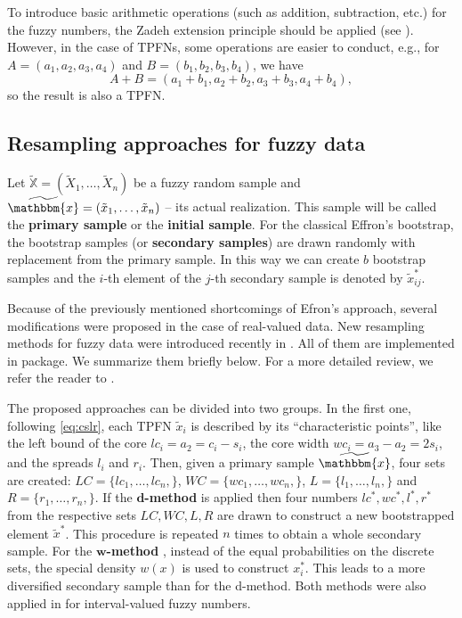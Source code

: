 To introduce basic arithmetic operations (such as addition, subtraction, etc.) for the fuzzy numbers, the Zadeh extension principle should be applied (see \cite{ban_coroianu_pg}).
However, in the case of TPFNs, some operations are easier to conduct, e.g., for $A = (a_1, a_2, a_3, a_4) $ and $B = (b_1, b_2, b_3, b_4)$, we have
\begin{equation}
	A + B = (a_1+b_1, a_2+b_2, a_3+b_3,a_4+b_4) ,
\end{equation}
so the result is also a TPFN.




\subsection{Resampling approaches for fuzzy data}

Let $\widetilde{\mathbb{X}}=(\tilde{X}_1,\ldots,\tilde{X}_n)$ be a fuzzy random sample \citep{puri1986} and $\widetilde{\mathbbm{x}}=(\tilde{x}_1,\ldots,\tilde{x}_n)$ -- its actual realization. 
This sample will be called the \textbf{primary sample} or the \textbf{initial sample}.
For the classical Effron's bootstrap, the bootstrap samples (or \textbf{secondary samples}) are drawn randomly with replacement from the primary sample.
In this way we can create $b$ bootstrap samples and the $i$-th element of the $j$-th secondary sample is denoted by $\tilde{x}_{ij}^*$.

Because of the previously mentioned shortcomings of Efron's approach, several modifications were proposed in the case of real-valued data.
New resampling methods for fuzzy data were introduced recently in \cite{grzegorzewski2019,grzegorzewski_ijcis2020,grzegorzewski_amcs2020,romaniuk2019,romaniuk_hryniewicz}. All of them are implemented in  package.
We summarize them briefly below. For a more detailed review, we refer the reader to \cite{GrzegorzewskiRom2021}.

The proposed approaches can be divided into two groups. In the first one, following \eqref{eq:cslr}, each TPFN $\tilde{x}_i$ is described by its ``characteristic points'', like the left bound of the core $lc_i= a_2 =c_i-s_i$, the core width $wc_i= a_3 - a_2 = 2s_i$, and the spreads $l_i$ and $r_i$.
Then, given a primary sample $\widetilde{\mathbbm{x}}$, four sets are created: $LC = \{ lc_1,\ldots,lc_n,\}$,  $WC = \{ wc_1,\ldots,wc_n,\}$, $L = \{ l_1,\ldots,l_n,\}$ and $R = \{ r_1,\ldots,r_n,\}$.
If the $\mathbf{d}$\textbf{-method} \citep{romaniuk_hryniewicz} is applied then four numbers $lc^*, wc^*, l^*, r^*$ from the respective sets $LC, WC, L, R$ are drawn to construct a new bootstrapped element $\tilde{x}^*$.
This procedure is repeated $n$ times to obtain a whole secondary sample.
For the $\mathbf{w}$\textbf{-method} \citep{romaniuk_hryniewicz}, instead of the equal probabilities on the discrete sets, the special density $w(x)$ is used to construct $x_i^*$.
This leads to a more diversified secondary sample than for the d-method.
Both methods were also applied in  \cite{8920048} for interval-valued fuzzy numbers.

